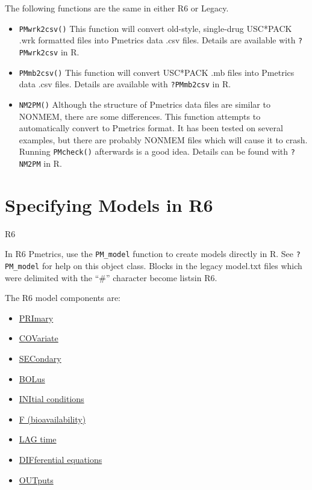 \documentclass[
]{book}
\providecommand{\tightlist}{%
  \setlength{\itemsep}{0pt}\setlength{\parskip}{0pt}}
\begin{document}
The following functions are the same in either {R6} or
{Legacy}.

\begin{itemize}
\item
  \texttt{PMwrk2csv()} This function will convert old-style, single-drug USC*PACK
  .wrk formatted files into Pmetrics data .csv files. Details are
  available with \texttt{?PMwrk2csv} in R.
\item
  \texttt{PMmb2csv()} This function will convert USC*PACK .mb files into Pmetrics
  data .csv files. Details are available with \texttt{?PMmb2csv} in R.
\item
  \texttt{NM2PM()} Although the structure of Pmetrics data files are similar to
  NONMEM, there are some differences. This function attempts to
  automatically convert to Pmetrics format. It has been tested on several
  examples, but there are probably NONMEM files which will cause it to
  crash. Running \texttt{PMcheck()} afterwards is a good idea. Details can be found
  with \texttt{?NM2PM} in R.
\end{itemize}

\hypertarget{specifying-models-in-r6}{%
\section{Specifying Models in R6}\label{specifying-models-in-r6}}

{R6}

In R6 Pmetrics, use the \texttt{PM\_model} function to create models directly
in R. See \texttt{?PM\_model} for help on this object class. Blocks in the legacy model.txt files which were delimited with the ``\#'' character become listsin R6.

The R6 model components are:

\begin{itemize}
\tightlist
\item
  \protect\hyperlink{priR6}{PRImary}
\item
  \protect\hyperlink{covR6}{COVariate}
\item
  \protect\hyperlink{secR6}{SECondary}
\item
  \protect\hyperlink{bolR6}{BOLus}
\item
  \protect\hyperlink{iniR6}{INItial conditions}
\item
  \protect\hyperlink{FaR6}{F (bioavailability)}
\item
  \protect\hyperlink{lagR6}{LAG time}
\item
  \protect\hyperlink{diffR6}{DIFferential equations}
\item
  \protect\hyperlink{outR6}{OUTputs}
\end{itemize}
\end{document}
